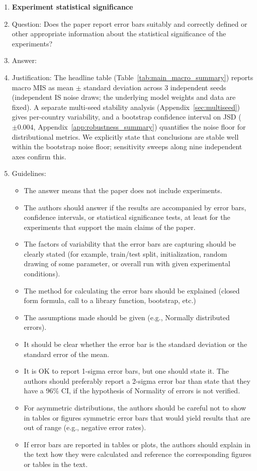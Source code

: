 \begin{enumerate}
\item {\bf Experiment statistical significance}
    \item[] Question: Does the paper report error bars suitably and correctly defined or other appropriate information about the statistical significance of the experiments?
    \item[] Answer: \answerYes{}
    \item[] Justification: The headline table (Table~\ref{tab:main_macro_summary}) reports macro MIS as mean $\pm$ standard deviation across 3 independent seeds (independent IS noise draws; the underlying model weights and data are fixed). A separate multi-seed stability analysis (Appendix~\ref{sec:multiseed}) gives per-country variability, and a bootstrap confidence interval on JSD ($\pm 0.004$, Appendix~\ref{app:robustness_summary}) quantifies the noise floor for distributional metrics. We explicitly state that conclusions are stable well within the bootstrap noise floor; sensitivity sweeps along nine independent axes confirm this.
    \item[] Guidelines:
    \begin{itemize}
        \item The answer \answerNA{} means that the paper does not include experiments.
        \item The authors should answer \answerYes{} if the results are accompanied by error bars, confidence intervals, or statistical significance tests, at least for the experiments that support the main claims of the paper.
        \item The factors of variability that the error bars are capturing should be clearly stated (for example, train/test split, initialization, random drawing of some parameter, or overall run with given experimental conditions).
        \item The method for calculating the error bars should be explained (closed form formula, call to a library function, bootstrap, etc.)
        \item The assumptions made should be given (e.g., Normally distributed errors).
        \item It should be clear whether the error bar is the standard deviation or the standard error of the mean.
        \item It is OK to report 1-sigma error bars, but one should state it. The authors should preferably report a 2-sigma error bar than state that they have a 96\% CI, if the hypothesis of Normality of errors is not verified.
        \item For asymmetric distributions, the authors should be careful not to show in tables or figures symmetric error bars that would yield results that are out of range (e.g., negative error rates).
        \item If error bars are reported in tables or plots, the authors should explain in the text how they were calculated and reference the corresponding figures or tables in the text.
    \end{itemize}


\end{enumerate}
